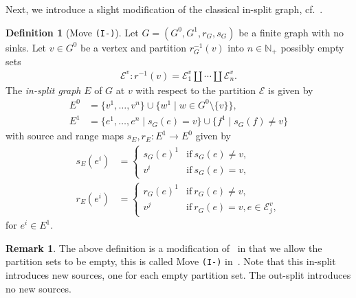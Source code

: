 \documentclass[12pt,a4paper,oneside,reqno,final]{amsart}
\newcommand{\LRA}{\longrightarrow}
\newcommand{\N}{\mathbb{N}}
\newcommand{\E}{\mathcal{E}}
\theoremstyle{definition}
\newtheorem{definition}[lemma]{Definition}
\newtheorem{remark}[lemma]{Remark}
\numberwithin{equation}{section} %
\begin{document}
Next, we introduce a slight modification of the classical in-split graph, cf.~\cite{Eilers-Ruiz}.

\begin{definition}[Move \texttt{(I-)}]\label{def:(I-)}
    Let $G = (G^0, G^1, r_G, s_G)$ be a finite graph with no sinks.
    Let $v\in G^0$ be a vertex and partition $r_G^{-1}(v)$ into $n\in \N_+$ possibly empty sets
    \begin{align}\label{eq:in-partition}
        \E^v: r^{-1}(v) = \E^v_1 \amalg\cdots \amalg \E^v_n.
    \end{align}
    The \emph{in-split graph} $E$ of $G$ at $v$ with respect to the partition $\E$ is given by
    \begin{align*}
        E^0 &= \{ v^1,\ldots,v^n \} \cup \{w^1 \mid w\in G^0\setminus \{v\}\}, \\
        E^1 &= \{ e^1,\ldots, e^n \mid s_G(e) = v \} \cup \{f^1 \mid s_G(f) \neq v \}   
    \end{align*}
    with source and range maps $s_E, r_E\colon E^1 \LRA E^0$ given by
    \begin{align*}
        s_E(e^i) &= 
        \begin{cases}
            s_G(e)^1    & \textrm{if}~s_G(e)\neq v, \\
            v^i         & \textrm{if}~s_G(e) = v,
        \end{cases}\\
        r_E(e^i) &= 
        \begin{cases}
            r_G(e)^1   & \textrm{if}~r_G(e) \neq v, \\
            v^j        & \textrm{if}~r_G(e) = v, e\in \E^v_j,
        \end{cases}
    \end{align*}
    for $e^i\in E^1$.
\end{definition}

\begin{remark}
  The above definition is a modification of~\cite[Section 5]{Bates-Pask2004} in that we allow the partition sets to be empty,
  this is called Move \texttt{(I-)} in~\cite[Definition 3.3]{Eilers-Ruiz}.
    Note that this in-split introduces new sources, one for each empty partition set.
    The out-split introduces no new sources.
\end{remark}
\end{document}
